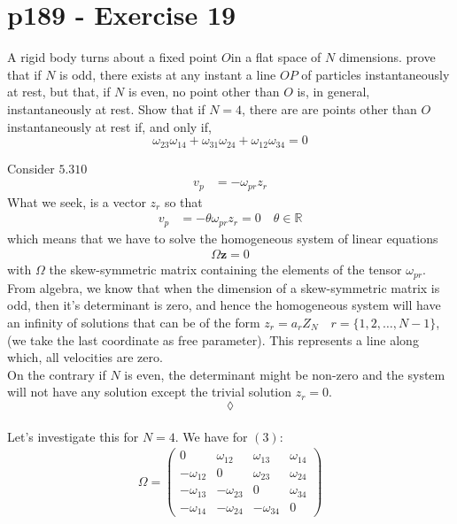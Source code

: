 \section{p189 - Exercise 19}
\begin{tcolorbox}
A rigid body turns about a fixed point $O$in a flat space of $N$ dimensions. prove that if $N$ is odd, there exists at any instant a line $OP$ of particles instantaneously at rest, but that, if $N$ is even, no point other than $O$ is, in general, instantaneously at rest. Show that if $N=4$, there are are points other than $O$ instantaneously at rest if, and only if,
$$\omega_{23}\omega_{14}+\omega_{31}\omega_{24}+\omega_{12}\omega_{34}=0$$
\end{tcolorbox} 
Consider $\mathbf{5.310}$
\begin{align}
v_p &= - \omega_{pr}z_{r}
\end{align}
What we seek, is a vector $z_{r}$ so that 
\begin{align}
v_p &= - \theta \omega_{pr}z_{r} = 0 \quad \theta \in\mathbb{R}
\end{align}
which means that we have to solve the homogeneous system of linear equations
\begin{align}
\Omega \mathbf{z} =0
\end{align}
with $\Omega$ the skew-symmetric matrix containing the elements of the tensor $\omega_{pr}$.
From algebra, we know that when the dimension of a skew-symmetric matrix is odd, then it's determinant is zero, and hence the homogeneous system will have an infinity of solutions that can be of the  form $z_r = a_rZ_N \quad r=\{1,2,\dots, N-1\}$, (we take the last coordinate as free parameter). This represents a line along which, all velocities are zero.\\
On the contrary if $N$ is even, the determinant might be non-zero and the system will not have any solution except the trivial solution $z_r=0$.\\
$$\lozenge$$\\
Let's investigate this for $N=4$. We have for $(3)$:
\begin{align}
\Omega =\left( \begin{matrix}
0&\omega_{12}&\omega_{13}&\omega_{14}\\
-\omega_{12}&0&\omega_{23}&\omega_{24}\\
-\omega_{13}&-\omega_{23}&0&\omega_{34}\\
-\omega_{14}&-\omega_{24}&-\omega_{34}&0
\end{matrix}\right)
\end{align}
